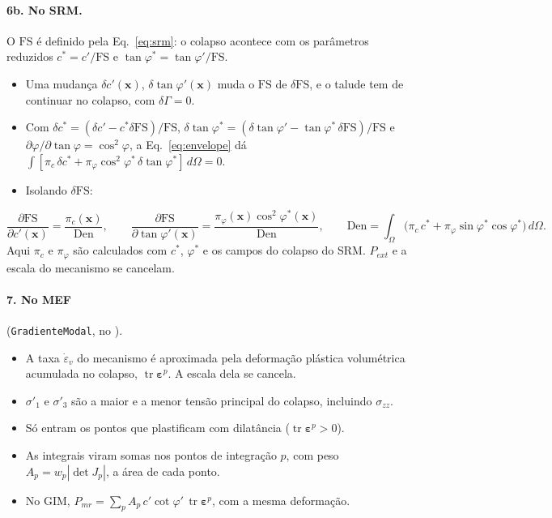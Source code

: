 \documentclass[11pt,a4paper]{article}
\newcommand{\FS}{\mathrm{FS}}
\begin{document}
\paragraph{6b. No SRM.} O $\FS$ é definido pela Eq.~\eqref{eq:srm}: o colapso acontece com os parâmetros reduzidos
$c^* = c'/\FS$ e $\tan\varphi^* = \tan\varphi'/\FS$.
\begin{itemize}
  \item Uma mudança $\delta c'(\bm x)$, $\delta\tan\varphi'(\bm x)$ muda o $\FS$ de $\delta\FS$, e o talude tem de
    continuar no colapso, com $\delta\Gamma = 0$.
  \item Com $\delta c^* = (\delta c' - c^*\delta\FS)/\FS$, $\delta\tan\varphi^* = (\delta\tan\varphi' - \tan\varphi^*\,
    \delta\FS)/\FS$ e $\partial\varphi/\partial\tan\varphi = \cos^2\varphi$, a Eq.~\eqref{eq:envelope} dá
    $\int[\pi_c\,\delta c^* + \pi_\varphi\cos^2\varphi^*\,\delta\tan\varphi^*]\,d\Omega = 0$.
  \item Isolando $\delta\FS$:
\end{itemize}
\begin{equation}
  \frac{\partial\FS}{\partial c'(\bm x)} = \frac{\pi_c(\bm x)}{\mathrm{Den}}, \qquad
  \frac{\partial\FS}{\partial\tan\varphi'(\bm x)} = \frac{\pi_\varphi(\bm x)\cos^2\varphi^*(\bm x)}{\mathrm{Den}}, \qquad
  \mathrm{Den} = \int_\Omega\big(\pi_c\,c^* + \pi_\varphi\sin\varphi^*\cos\varphi^*\big)\,d\Omega.
  \label{eq:dsrm}
\end{equation}
Aqui $\pi_c$ e $\pi_\varphi$ são calculados com $c^*$, $\varphi^*$ e os campos do colapso do SRM. $P_{ext}$ e a escala
do mecanismo se cancelam.

\paragraph{7. No MEF} (\texttt{GradienteModal}, no ).
\begin{itemize}
  \item A taxa $\dot\varepsilon_v$ do mecanismo é aproximada pela deformação plástica volumétrica acumulada no
    colapso, $\operatorname{tr}\bm\varepsilon^p$. A escala dela se cancela.
  \item $\sigma'_1$ e $\sigma'_3$ são a maior e a menor tensão principal do colapso, incluindo $\sigma_{zz}$.
  \item Só entram os pontos que plastificam com dilatância ($\operatorname{tr}\bm\varepsilon^p > 0$).
  \item As integrais viram somas nos pontos de integração $p$, com peso $A_p = w_p|\det J_p|$, a área de cada ponto.
  \item No GIM, $P_{mr} = \sum_p A_p\,c'\cot\varphi'\,\operatorname{tr}\bm\varepsilon^p$, com a mesma deformação.
\end{itemize}
\end{document}
